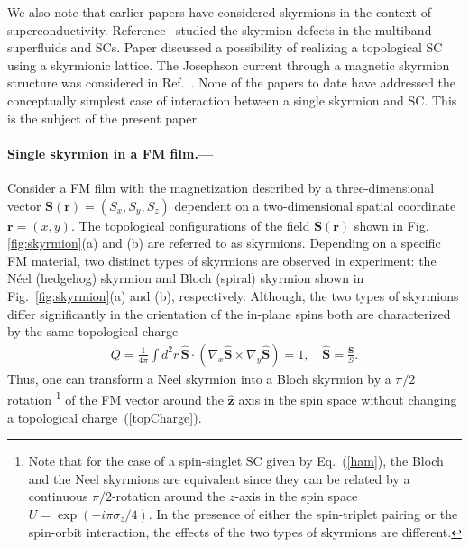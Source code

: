 \documentclass[twocolumn,showpacs,floatfix,longbibliography]{revtex4-1}
\begin{document}
We also note that earlier papers have considered skyrmions in the context of superconductivity. Reference~\cite{Garaud2011} studied the skyrmion-defects in the multiband superfluids and SCs. Paper \cite{Nakosai2013} discussed a possibility of realizing a topological SC using a skyrmionic lattice. The Josephson current through a magnetic skyrmion structure was considered in Ref.~\cite{Yokoyama2015}. None of the papers to date have addressed the conceptually simplest case of interaction between a single skyrmion and SC. This is the subject of the present paper.

\paragraph*{Single skyrmion in a FM film.---} \label{sec:skyrmion}


Consider a FM film with the magnetization described by a three-dimensional vector $\bm S(\bm r) = (S_x,S_y,S_z)$ dependent on a two-dimensional spatial coordinate $\bm r = (x,y)$. The topological configurations of the field $\bm S(\bm r)$ shown in Fig. \ref{fig:skyrmion}(a) and (b) are referred to as skyrmions.  Depending on a specific FM material, two distinct types of skyrmions are observed in experiment: the N\'eel (hedgehog) skyrmion and Bloch (spiral) skyrmion shown in Fig.~\ref{fig:skyrmion}(a) and (b), respectively. Although, the two types of skyrmions differ significantly in the orientation of the in-plane spins both are characterized by the same topological charge
\begin{align}
	Q = \frac{1}{4\pi} \int d^2r \, \hat {\bm S}\cdot (\nabla_x\hat {\bm S}\times\nabla_y\hat {\bm S})=1,\quad  \hat {\bm S}= \frac{\bm S}{S}.
	\label{topCharge}
\end{align}
Thus, one can transform a Neel skyrmion into a Bloch skyrmion by a $\pi/2$ rotation  \footnote{\label{footnote:Rotation} Note that for the case of a spin-singlet SC given by Eq.~(\ref{ham}), the Bloch and the Neel skyrmions are equivalent since they can be related by a continuous $\pi/2$-rotation around the $z$-axis in the spin space $U = \exp(-i\pi\sigma_z/4)$. In the presence of either the spin-triplet pairing or the spin-orbit interaction, the effects of the two types of skyrmions are different.} of the FM vector around the $\hat {\bm z}$ axis in the spin space without changing a topological charge~(\ref{topCharge}). 
\end{document}

